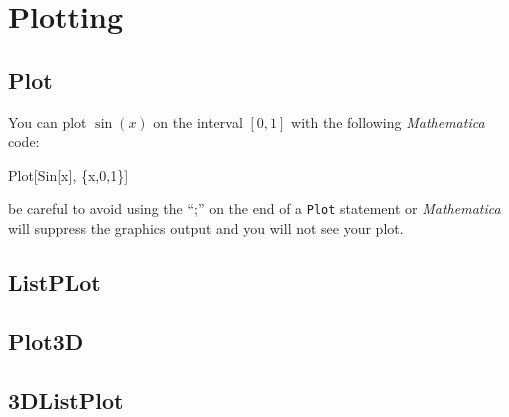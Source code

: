 \chapter{Plotting}
\label{chap:Plotting}

\section{Plot}
You can plot $\sin(x)$ on the interval $[0,1]$ with the following \emph{Mathematica} code:
\begin{code}
	   Plot[Sin[x], \{x,0,1\}]
\end{code}
be careful to avoid using the ``;'' on the end of a \texttt{Plot} statement or \emph{Mathematica} will suppress the graphics output and you will not see your plot.

\section{ListPLot}

\section{Plot3D}

\section{3DListPlot}

